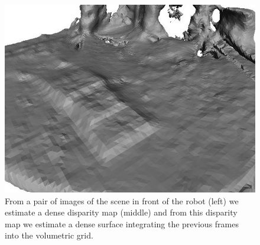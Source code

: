 \begin{figure}[h]
\hspace{0.2cm}
\includegraphics[scale=0.22]{figures/snapshot02}
\caption[]{From a pair of images of the scene in front of the robot (left) we estimate a dense disparity map (middle) and from this disparity map we estimate a dense surface integrating the previous frames into the volumetric grid.}
\label{Fig:Reconstruction}
\end{figure}
